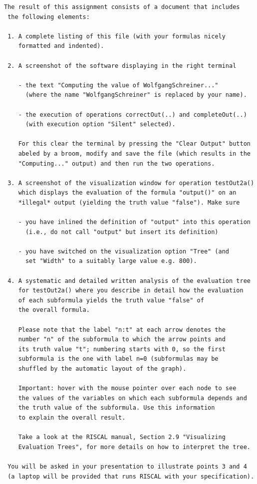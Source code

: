 \documentclass{article}
\begin{document}
\begin{lstlisting}[mathescape=true, columns=flexible]
 The result of this assignment consists of a document that includes
 the following elements:
 
 1. A complete listing of this file (with your formulas nicely
    formatted and indented).
 
 2. A screenshot of the software displaying in the right terminal
 
    - the text "Computing the value of WolfgangSchreiner..." 
      (where the name "WolfgangSchreiner" is replaced by your name).
 
    - the execution of operations correctOut(..) and completeOut(..) 
      (with execution option "Silent" selected).
 
    For this clear the terminal by pressing the "Clear Output" button
    abeled by a broom, modify and save the file (which results in the
    "Computing..." output) and then run the two operations.
 
 3. A screenshot of the visualization window for operation testOut2a()
    which displays the evaluation of the formula "output()" on an 
    *illegal* output (yielding the truth value "false"). Make sure
 
    - you have inlined the definition of "output" into this operation
      (i.e., do not call "output" but insert its definition)
 
    - you have switched on the visualization option "Tree" (and
      set "Width" to a suitably large value e.g. 800).
 
 4. A systematic and detailed written analysis of the evaluation tree
    for testOut2a() where you describe in detail how the evaluation 
    of each subformula yields the truth value "false" of
    the overall formula.
 
    Please note that the label "n:t" at each arrow denotes the 
    number "n" of the subformula to which the arrow points and 
    its truth value "t"; numbering starts with 0, so the first 
    subformula is the one with label n=0 (subformulas may be
    shuffled by the automatic layout of the graph).
 
    Important: hover with the mouse pointer over each node to see 
    the values of the variables on which each subformula depends and 
    the truth value of the subformula. Use this information
    to explain the overall result.
 
    Take a look at the RISCAL manual, Section 2.9 "Visualizing
    Evaluation Trees", for more details on how to interpret the tree.
 
 You will be asked in your presentation to illustrate points 3 and 4 
 (a laptop will be provided that runs RISCAL with your specification).
 

\end{lstlisting}
\end{document}
